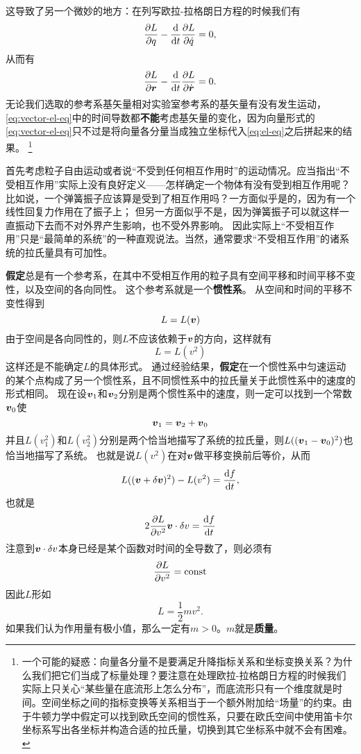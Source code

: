 \documentclass[UTF8, a4paper]{ctexart}
\newcommand*{\const}{\mathrm{const}}
\begin{document}
这导致了另一个微妙的地方：在列写欧拉-拉格朗日方程的时候我们有
\begin{equation}
    \pdv{L}{q} - \dv{t} \pdv{L}{\dot{q}} = 0,
    \label{eq:el-eq}
\end{equation}
从而有
\begin{equation}
    \pdv{L}{\vb*{r}} - \dv{t} \pdv{L}{\dot{\vb*{r}}} = 0.
    \label{eq:vector-el-eq}
\end{equation}
无论我们选取的参考系基矢量相对实验室参考系的基矢量有没有发生运动，\eqref{eq:vector-el-eq}中的时间导数都\textbf{不能}考虑基矢量的变化，因为向量形式的\eqref{eq:vector-el-eq}只不过是将向量各分量当成独立坐标代入\eqref{eq:el-eq}之后拼起来的结果。%
\footnote{一个可能的疑惑：向量各分量不是要满足升降指标关系和坐标变换关系？为什么我们把它们当成了标量处理？要注意在处理欧拉-拉格朗日方程的时候我们实际上只关心“某些量在底流形上怎么分布”，而底流形只有一个维度就是时间。空间坐标之间的指标变换等关系相当于一个额外附加给“场量”的约束。由于牛顿力学中假定可以找到欧氏空间的惯性系，只要在欧氏空间中使用笛卡尔坐标系写出各坐标并构造合适的拉氏量，切换到其它坐标系中就不会有困难。}

首先考虑粒子自由运动或者说“不受到任何相互作用时”的运动情况。应当指出“不受相互作用”实际上没有良好定义——怎样确定一个物体有没有受到相互作用呢？
比如说，一个弹簧振子应该算是受到了相互作用吗？一方面似乎是的，因为有一个线性回复力作用在了振子上；
但另一方面似乎不是，因为弹簧振子可以就这样一直振动下去而不对外界产生影响，也不受外界影响。
因此实际上“不受相互作用”只是“最简单的系统”的一种直观说法。当然，通常要求“不受相互作用”的诸系统的拉氏量具有可加性。

\textbf{假定}总是有一个参考系，在其中不受相互作用的粒子具有空间平移和时间平移不变性，以及空间的各向同性。
这个参考系就是一个\textbf{惯性系}。
从空间和时间的平移不变性得到
\[
    L = L(\vb*{v})
\]
由于空间是各向同性的，则$L$不应该依赖于$\vb*{v}$的方向，这样就有
\[
    L = L(v^2)
\]
这样还是不能确定$L$的具体形式。
通过经验结果，\textbf{假定}在一个惯性系中匀速运动的某个点构成了另一个惯性系，且不同惯性系中的拉氏量关于此惯性系中的速度的形式相同。
现在设$\vb*{v}_1$和$\vb*{v}_2$分别是两个惯性系中的速度，则一定可以找到一个常数$\vb*{v}_0$使
\[
    \vb*{v}_1 = \vb*{v}_2 + \vb*{v}_0
\]
并且$L(v_1^2)$和$L(v_2^2)$分别是两个恰当地描写了系统的拉氏量，则$L((\vb*{v}_1 - \vb*{v}_0)^2)$也恰当地描写了系统。
也就是说$L(v^2)$在对$\vb*{v}$做平移变换前后等价，从而
\[
    L((\vb*{v} + \delta \vb*{v})^2) - L(v^2) = \dv{f}{t},
\]
也就是
\[
    2 \pdv{L}{v^2} \vb*{v} \cdot \delta v = \dv{f}{t}
\]
注意到$\vb*{v} \cdot \delta v$本身已经是某个函数对时间的全导数了，则必须有
\[
    \pdv{L}{v^2} = \const
\]
因此$L$形如
\begin{equation}
    L = \frac{1}{2} m v^2.
    \label{eq:free-newton}
\end{equation}
如果我们认为作用量有极小值，那么一定有$m>0$。$m$就是\textbf{质量}。
\end{document}
